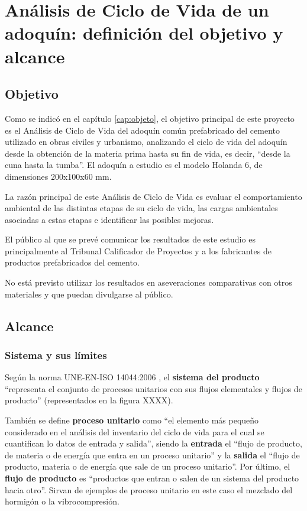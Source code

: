 \chapter{Análisis de Ciclo de Vida de un adoquín: definición del objetivo y alcance}
\section{Objetivo}
Como se indicó en el capítulo \ref{cap:objeto}, el objetivo principal de este proyecto es el Análisis de Ciclo de Vida del adoquín común prefabricado del cemento utilizado en obras civiles y urbanismo, analizando el ciclo de vida del adoquín desde la obtención de la materia prima hasta su fin de vida, es decir, ``desde la cuna hasta la tumba''. El adoquín a estudio es el modelo Holanda 6, de dimensiones 200x100x60 \si{mm}.

La razón principal de este Análisis de Ciclo de Vida es evaluar el comportamiento ambiental de las distintas etapas de su ciclo de vida, las cargas ambientales asociadas a estas etapas e identificar las posibles mejoras.

El público al que se prevé comunicar los resultados de este estudio es principalmente al Tribunal Calificador de Proyectos y a los fabricantes de productos prefabricados del cemento.

No está previsto utilizar los resultados en aseveraciones comparativas con otros materiales y que puedan divulgarse al público.

\section{Alcance}
\subsection{Sistema y sus límites}
Según la norma UNE-EN-ISO 14044:2006 \cite{iso14044}, el \textbf{sistema del producto} ``representa el conjunto de procesos unitarios con sus flujos elementales y flujos de producto'' (representados en la figura XXXX).


También se define \textbf{proceso unitario} como ``el elemento más pequeño considerado en el análisis del inventario del ciclo de vida para el cual se cuantifican lo datos de entrada y salida'', siendo la \textbf{entrada} el ``flujo de producto, de materia o de energía que entra en un proceso unitario'' y la \textbf{salida} el ``flujo de producto, materia o de energía que sale de un proceso unitario''. Por último, el \textbf{flujo de producto} es ``productos que entran o salen de un sistema del producto hacia otro''. Sirvan de ejemplos de proceso unitario en este caso el mezclado del hormigón o la vibrocompresión.

